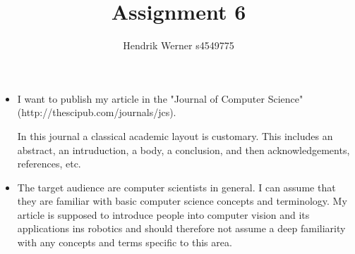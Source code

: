 \documentclass[12pt, a4paper]{article}
\title{Assignment 6}
\author{Hendrik Werner s4549775}
\begin{document}
\maketitle

\begin{itemize}
	\item I want to publish my article in the "Journal of Computer Science" (http://thescipub.com/journals/jcs).

	In this journal a classical academic layout is customary. This includes an abstract, an intruduction, a body, a conclusion, and then acknowledgements, references, etc.
	\item The target audience are computer scientists in general. I can assume that they are familiar with basic computer science concepts and terminology. My article is supposed to introduce people into computer vision and its applications ins robotics and should therefore not assume a deep familiarity with any concepts and terms specific to this area.
\end{itemize}
\end{document}

